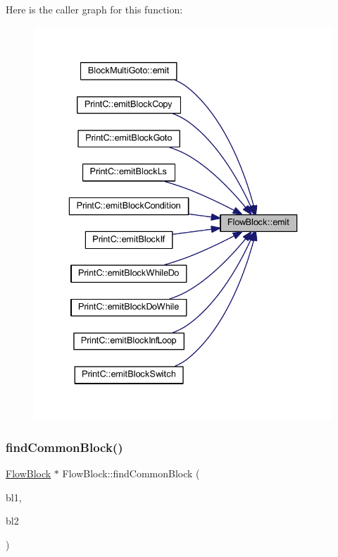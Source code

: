 Here is the caller graph for this function\+:
\nopagebreak
\begin{figure}[H]
\begin{center}
\leavevmode
\includegraphics[width=336pt]{class_flow_block_a9baddec2635c95a5ac9019d6b21d3eab_icgraph}
\end{center}
\end{figure}
\mbox{\label{class_flow_block_a5c7762af431a7897d31d51f6391926c2}} 
\subsubsection{\texorpdfstring{findCommonBlock()}{findCommonBlock()}}
{\footnotesize\ttfamily \mbox{\hyperlink{class_flow_block}{Flow\+Block}} $\ast$ Flow\+Block\+::find\+Common\+Block (\begin{DoxyParamCaption}\item[{\mbox{\hyperlink{class_flow_block}{Flow\+Block}} $\ast$}]{bl1,  }\item[{\mbox{\hyperlink{class_flow_block}{Flow\+Block}} $\ast$}]{bl2 }\end{DoxyParamCaption})\hspace{0.3cm}{\ttfamily [static]}}



